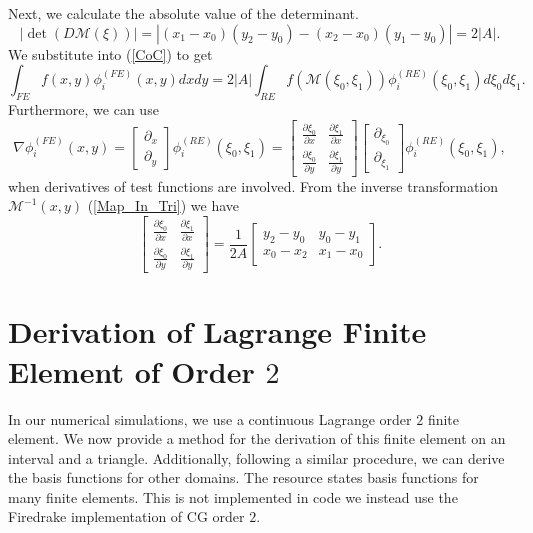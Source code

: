 \documentclass[12pt]{ociamthesis}
\begin{document}
Next, we calculate the absolute value of the determinant. 
\begin{equation}
|\det(D\mathcal{M}(\xi))| = |(x_1-x_0)(y_2-y_0)-(x_2-x_0)(y_1-y_0)| = 2|A|.
\end{equation}
We substitute into (\ref{CoC}) to get
\begin{equation}
\int_{FE}f(x,y)\phi_i^{(FE)}(x,y)dxdy =
2|A|\int_{RE}f(\mathcal{M}(\xi_0,\xi_1)) \phi_i^{(RE)}(\xi_0,\xi_1)d\xi_0d\xi_1.
\end{equation}
Furthermore, we can use
\begin{equation}
\nabla \phi_i^{(FE)}(x,y) = 
\left [
\begin{matrix}
\partial_x \\
\partial_y
\end{matrix}
\right]
\phi_i^{(RE)}(\xi_0, \xi_1) =
\left[
\begin{matrix}
\frac{\partial \xi_0}{\partial x} & 
\frac{\partial \xi_1}{\partial x} \\
\frac{\partial \xi_0}{\partial y} &
\frac{\partial \xi_1}{\partial y}
\end{matrix}
\right] 
\left [
\begin{matrix}
\partial_{\xi_0} \\
\partial_{\xi_1}
\end{matrix}
\right ]
\phi_i^{(RE)}(\xi_0, \xi_1),
\end{equation}
when derivatives of test functions are involved. From the inverse transformation $\mathcal{M}^{-1}(x, y)$ (\ref{Map_In_Tri}) we have
\begin{equation}
\left[
\begin{matrix}
\frac{\partial \xi_0}{\partial x} & 
\frac{\partial \xi_1}{\partial x} \\
\frac{\partial \xi_0}{\partial y} &
\frac{\partial \xi_1}{\partial y}
\end{matrix}
\right] = \frac{1}{2A}
\left[
\begin{matrix}
y_2-y_0 & y_0-y_1 \\
x_0-x_2 & x_1-x_0 
\end{matrix}
\right].
\end{equation}

\section{Derivation of Lagrange Finite Element of Order $2$} \label{LDEF}
In our numerical simulations, we use a continuous Lagrange order $2$ finite element. We now provide a method for the derivation of this finite element on an interval and a triangle. Additionally, following a similar procedure, we can derive the basis functions for other domains. The resource \cite{defelement} states basis functions for many finite elements. This is not implemented in code we instead use the Firedrake implementation of CG order $2$. 
\end{document}
